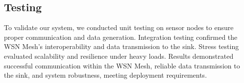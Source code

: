 \subsection{Testing}\label{testing}
To validate our system, we conducted unit testing on sensor nodes to ensure proper communication and data generation. Integration testing confirmed the WSN Mesh's interoperability and data transmission to the sink. Stress testing evaluated scalability and resilience under heavy loads. Results demonstrated successful communication within the WSN Mesh, reliable data transmission to the sink, and system robustness, meeting deployment requirements.

